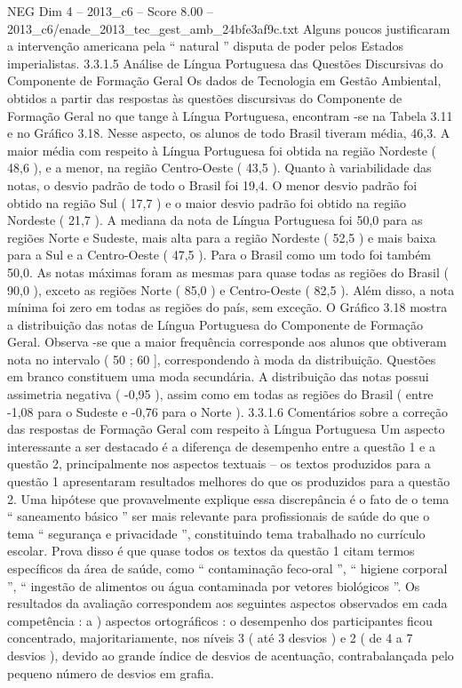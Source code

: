 \begin{textsample}{NEG Dim 4 – 2013\_c6 – Score 8.00 – 2013\_c6/enade\_2013\_tec\_gest\_amb\_24bfe3af9c.txt}
Alguns poucos justificaram a intervenção americana pela “ natural ” disputa de poder pelos Estados imperialistas. 3.3.1.5 Análise de Língua Portuguesa das Questões Discursivas do Componente de Formação Geral Os dados de Tecnologia em Gestão Ambiental, obtidos a partir das respostas às questões discursivas do Componente de Formação Geral no que tange à Língua Portuguesa, encontram -se na Tabela 3.11 e no Gráfico 3.18.
Nesse aspecto, os alunos de todo Brasil tiveram média, 46,3.
A maior média com respeito à Língua Portuguesa foi obtida na região Nordeste ( 48,6 ), e a menor, na região Centro-Oeste ( 43,5 ).
Quanto à variabilidade das notas, o desvio padrão de todo o Brasil foi 19,4.
O menor desvio padrão foi obtido na região Sul ( 17,7 ) e o maior desvio padrão foi obtido na região Nordeste ( 21,7 ).
A mediana da nota de Língua Portuguesa foi 50,0 para as regiões Norte e Sudeste, mais alta para a região Nordeste ( 52,5 ) e mais baixa para a Sul e a Centro-Oeste ( 47,5 ).
Para o Brasil como um todo foi também 50,0.
As notas máximas foram as mesmas para quase todas as regiões do Brasil ( 90,0 ), exceto as regiões Norte ( 85,0 ) e Centro-Oeste ( 82,5 ).
Além disso, a nota mínima foi zero em todas as regiões do país, sem exceção.
O Gráfico 3.18 mostra a distribuição das notas de Língua Portuguesa do Componente de Formação Geral.
Observa -se que a maior frequência corresponde aos alunos que obtiveram nota no intervalo ( 50 ; 60 ], correspondendo à moda da distribuição.
Questões em branco constituem uma moda secundária.
A distribuição das notas possui assimetria negativa ( -0,95 ), assim como em todas as regiões do Brasil ( entre -1,08 para o Sudeste e -0,76 para o Norte ). 3.3.1.6 Comentários sobre a correção das respostas de Formação Geral com respeito à Língua Portuguesa Um aspecto interessante a ser destacado é a diferença de desempenho entre a questão 1 e a questão 2, principalmente nos aspectos textuais – os textos produzidos para a questão 1 apresentaram resultados melhores do que os produzidos para a questão 2.
Uma hipótese que provavelmente explique essa discrepância é o fato de o tema “ saneamento básico ” ser mais relevante para profissionais de saúde do que o tema “ segurança e privacidade ”, constituindo tema trabalhado no currículo escolar.
Prova disso é que quase todos os textos da questão 1 citam termos específicos da área de saúde, como “ contaminação feco-oral ”, “ higiene corporal ”, “ ingestão de alimentos ou água contaminada por vetores biológicos ”.
Os resultados da avaliação correspondem aos seguintes aspectos observados em cada competência : a ) aspectos ortográficos : o desempenho dos participantes ficou concentrado, majoritariamente, nos níveis 3 ( até 3 desvios ) e 2 ( de 4 a 7 desvios ), devido ao grande índice de desvios de acentuação, contrabalançada pelo pequeno número de desvios em grafia.

\end{textsample}
